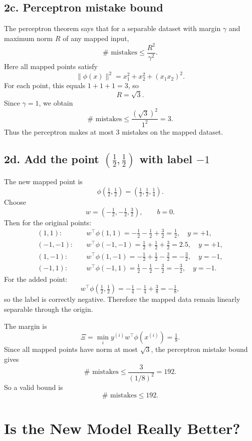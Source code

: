 \documentclass[11pt]{article}
\begin{document}
\subsection*{2c. Perceptron mistake bound}

The perceptron theorem says that for a separable dataset with margin $\gamma$ and maximum norm $R$ of any mapped input,
\[
\text{# mistakes} \le \frac{R^2}{\gamma^2}.
\]
Here all mapped points satisfy
\[
\|\phi(x)\|^2 = x_1^2+x_2^2+(x_1x_2)^2.
\]
For each point, this equals $1+1+1=3$, so
\[
R=\sqrt3.
\]
Since $\gamma=1$, we obtain
\[
\boxed{\text{# mistakes} \le \frac{(\sqrt3)^2}{1^2}=3.}
\]
Thus the perceptron makes at most 3 mistakes on the mapped dataset.

\subsection*{2d. Add the point $(\tfrac12,\tfrac12)$ with label $-1$}

The new mapped point is
\[
\phi\left(\tfrac12,\tfrac12\right)=\left(\tfrac12,\tfrac12,\tfrac14\right).
\]
Choose
\[
w=\left(-\tfrac12,-\tfrac12,\tfrac32\right),\qquad b=0.
\]
Then for the original points:
\[
\begin{aligned}
(1,1):&\quad w^\top \phi(1,1)= -\tfrac12-\tfrac12+\tfrac32 = \tfrac12,\quad y=+1,\\
(-1,-1):&\quad w^\top \phi(-1,-1)= \tfrac12+\tfrac12+\tfrac32 = 2.5,\quad y=+1,\\
(1,-1):&\quad w^\top \phi(1,-1)= -\tfrac12+\tfrac12-\tfrac32 = -\tfrac32,\quad y=-1,\\
(-1,1):&\quad w^\top \phi(-1,1)= \tfrac12-\tfrac12-\tfrac32 = -\tfrac32,\quad y=-1.
\end{aligned}
\]
For the added point:
\[
w^\top \phi(\tfrac12,\tfrac12)= -\tfrac14-\tfrac14+\tfrac38 = -\tfrac18,
\]
so the label is correctly negative.
Therefore the mapped data remain linearly separable through the origin.

The margin is
\[
\Xi = \min_i y^{(i)} w^\top \phi(x^{(i)}) = \tfrac18.
\]
Since all mapped points have norm at most $\sqrt3$, the perceptron mistake bound gives
\[
\text{# mistakes} \le \frac{3}{(1/8)^2}=192.
\]
So a valid bound is
\[
\boxed{\text{# mistakes} \le 192.}
\]

\section{Is the New Model Really Better?}
\end{document}
